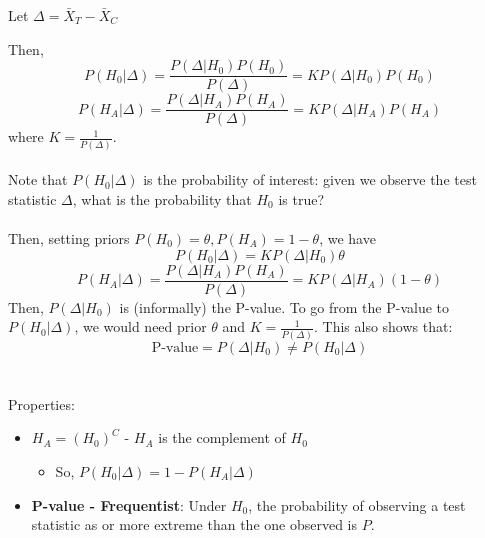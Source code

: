 \documentclass{article}
\begin{document}
Let $\Delta = \bar{X}_T - \bar{X}_C$

Then,
\[
    P(H_0 | \Delta) =  \frac{P(\Delta|H_0) P(H_0)}{P(\Delta)} = KP(\Delta|H_0) P(H_0)
\]
\[
    P(H_A | \Delta) =  \frac{P(\Delta|H_A) P(H_A)}{P(\Delta)} = KP(\Delta|H_A) P(H_A)
\] where $K = \frac{1}{P(\Delta)}$.
\\
\\
Note that $P(H_0|\Delta)$ is the probability of interest: given we observe the test statistic $\Delta$, what is the probability that $H_0$ is true?
\\
\\
Then, setting priors $P(H_0) = \theta, P(H_A) = 1 - \theta$, we have
\\
\[
    P(H_0 | \Delta) = KP(\Delta|H_0)\theta
\]
\[
    P(H_A | \Delta) =  \frac{P(\Delta|H_A) P(H_A)}{P(\Delta)} = KP(\Delta|H_A)(1-\theta)
\]
Then, $P(\Delta|H_0)$ is (informally) the P-value. To go from the P-value to $P(H_0|\Delta)$, we would need prior $\theta$ and $K = \frac{1}{P(\Delta)}$. This also shows that:
\[
    \text{P-value} = P(\Delta|H_0) \neq P(H_0|\Delta)
\]
\\
\\
Properties:
\begin{itemize}
    \item $H_A =(H_0)^C$ - $H_A$ is the complement of $H_0$
    \begin{itemize}
        \item So, $P(H_0|\Delta) = 1 - P(H_A|\Delta)$
    \end{itemize}
    \item \textbf{P-value - Frequentist}: Under $H_0$, the probability of observing a test statistic as or more extreme than the one observed is $P$.
\end{itemize}
\end{document}
